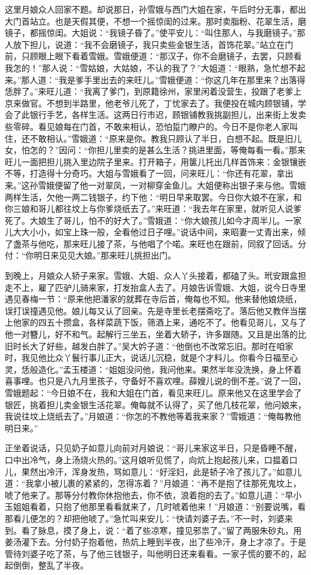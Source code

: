 这里月娘众人回家不题。却说那日，孙雪娥与西门大姐在家，午后时分无事，都出大门首站立。也是天假其便，不想一个摇惊闺的过来。那时卖脂粉、花翠生活，磨镜子，都摇惊闺。大姐说：“我镜子昏了。”使平安儿：“叫住那人，与我磨镜子。”那人放下担儿，说道：“我不会磨镜子，我只卖些金银生活，首饰花翠。”站立在门前，只顾眼上眼下看着雪娥。雪娥便道：“那汉子，你不会磨镜子，去罢，只顾看我怎的！”那人说：“雪姑娘，大姑娘，不认的我了？”大姐道：“眼熟，急忙想不起来。”那人道：“我是爹手里出去的来旺儿。”雪娥便道：“你这几年在那里来？出落得恁胖了。”来旺儿道：“我离了爹门，到原籍徐州，家里闲着没营生，投跟了老爹上京来做官。不想到半路里，他老爷儿死了，丁忧家去了。我便投在城内顾银铺，学会了此银行手艺，各样生活。这两日行市迟，顾银铺教我挑副担儿，出来街上发卖些零碎。看见娘每在门首，不敢来相认，恐怕踅门瞭户的。今日不是你老人家叫住，还不敢相认。”雪娥道：“原来是你。教我只顾认了半日，白想不起。既是旧儿女，怕怎的？”因问：“你担儿里卖的是甚么生活？挑进里面，等俺每看一看。”那来旺儿一面把担儿挑入里边院子里来。打开箱子，用箧儿托出几样首饰来：金银镶嵌不等，打造得十分奇巧。大姐与雪娥看了一回，问来旺儿：“你还有花翠，拿出来。”这孙雪娥便留了他一对翠凤，一对柳穿金鱼儿。大姐便称出银子来与他。雪娥两样生活，欠他一两二钱银子，约下他：“明日早来取罢。今日你大娘不在家，和你三娘和哥儿都往坟上与你爹烧纸去了。”来旺道：“我去年在家里，就听见人说爹死了。大娘生了哥儿，怕不的好大了。”雪娥道：“你大娘孩儿如今才周半儿。一家儿大大小小，如宝上珠一般，全看他过日子哩。”说话中间，来昭妻一丈青出来，倾了盏茶与他吃，那来旺儿接了茶，与他唱了个喏。来旺也在跟前，同叙了回话。分付：“你明日来见见大娘。”那来旺儿挑担出门。

到晚上，月娘众人轿子来家。雪娥、大姐、众人丫头接着，都磕了头。玳安跟盒担走不上，雇了匹驴儿骑来家，打发抬盒人去了。月娘告诉雪娥、大姐，说今日寺里遇见春梅一节：“原来他把潘家的就葬在寺后首，俺每也不知。他来替他娘烧纸，误打误撞遇见他。娘儿每又认了回亲。先是寺里长老摆斋吃了。落后他又教伴当摆上他家的四五十攒盒，各样菜蔬下饭，筛酒上来，通吃不了。他看见哥儿，又与了他一对簪儿，好不和气。起解行三坐五，坐着大轿子，许多跟随。又且是出落的比旧时长大了好些，越发白胖了。”吴大妗子道：“他倒也不改常忘旧。那时在咱家时，我见他比众丫鬟行事儿正大，说话儿沉稳，就是个才料儿。你看今日福至心灵，恁般造化。”孟玉楼道：“姐姐没问他，我问他来。果然半年没洗换，身上怀着喜事哩。也只是八九月里孩子，守备好不喜欢哩。薛嫂儿说的倒不差。”说了一回，雪娥题起：“今日娘不在，我和大姐在门首，看见来旺儿。原来他又在这里学会了银匠，挑着担儿卖金银生活花翠。俺每就不认得了，买了他几枝花翠，他问娘来，我说往坟上烧纸去了。”月娘道：“你怎的不教他等着我来家？”雪娥道：“俺每教他明日来。”

正坐着说话，只见奶子如意儿向前对月娘说：“哥儿来家这半日，只是昏睡不醒，口中出冷气，身上汤烧火热的。”这月娘听见慌了，向炕上抱起孩儿来，口揾着口儿，果然出冷汗，浑身发热，骂如意儿：“好淫妇，此是轿子冷了孩儿了。”如意儿道：“我拿小被儿裹的紧紧的，怎得冻着？”月娘道：“再不是抱了往那死鬼坟上，唬了他来了。那等分付教你休抱他去，你不依，浪着抱的去了。”如意儿道：“早小玉姐姐看着，只抱了他那里看看就来了，几时唬着他来！”月娘道：“别要说嘴，看那看儿便怎的？却把他唬了。”急忙叫来安儿：“快请刘婆子去。”不一时，刘婆来到。看了脉息，摸了身上，说：“着了些凉寒，撞见邪祟了。”留了两服朱砂丸，用姜汤灌下去。分付奶子抱着他，热炕上睡到半夜，出了些冷汗，身上才凉了。于是管待刘婆子吃了茶，与了他三钱银子，叫他明日还来看看。一家子慌的要不的，起起倒倒，整乱了半夜。

